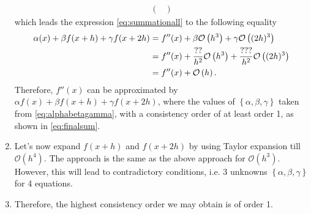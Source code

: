 \documentclass[12pt]{article}
\begin{document}
\begin{enumerate}
\begin{align}
\begin{pmatrix}
		      \end{pmatrix}
	      \end{align}
	      which leads the expression \eqref{eq:summationall} to the following equality
	      \begin{align}
		      \label{eq:finalsum}
		      \alpha (x) + \beta f(x+h) + \gamma f(x+2h) 
		       & =
		      f''(x)
		      + \beta \mathcal{O}\left( h^3 \right)
		      + \gamma \mathcal{O}\left( (2h)^3 \right) \notag                                         \\
		       & = f''(x)
		      + \frac{??}{h^2} \mathcal{O}\left( h^3 \right)
		      + \frac{???}{h^2} \mathcal{O}\left( (2h)^3 \right)                                \notag \\
		       & = f''(x) + \mathcal{O}\left( h \right).
	      \end{align}
	      Therefore, $f''(x)$ can be approximated by $\alpha f(x) + \beta f(x+h) + \gamma f(x+2h)$,
	      where the values of $\left\{ \alpha, \beta, \gamma \right\}$ taken from \eqref{eq:alphabetagamma}, 
	      with a consistency order of at least order 1, as shown in \eqref{eq:finalsum}.
	      
	\item Let's now expand $f(x+h)$ and $f(x+2h)$
	      by using Taylor expansion till $\mathcal{O}(h^4)$.
	      The approach is the same as the above approach  
	      for $\mathcal{O}(h^3)$.
	      However, this will lead to contradictory conditions,  
	      i.e. 3 unknowns $\left\{ \alpha, \beta, \gamma \right\}$  for 4 equations. 
	      
	\item Therefore, the highest consistency order we may obtain is of order 1.
\end{enumerate}

\newpage
\end{document}

